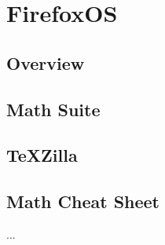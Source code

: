 \chapter{FirefoxOS}

\section{Overview}

\section{Math Suite}

\section{TeXZilla}

\section{Math Cheat Sheet}

...
